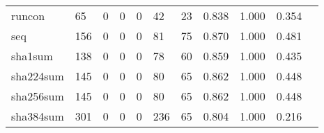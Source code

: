 \begin{longtable}{lp{1.2cm}p{1.2cm}p{1.2cm}p{1.2cm}p{1.2cm}p{1.2cm}p{1.2cm}p{1.2cm}p{1.2cm}p{1.2cm}}
runcon    &                                    65 &                                                  0 &                                                  0 &                                                  0 &                                                 42 &                                                 23 &                                         0.838 &                                              1.000 &                                              0.354 \\
seq       &                                   156 &                                                  0 &                                                  0 &                                                  0 &                                                 81 &                                                 75 &                                         0.870 &                                              1.000 &                                              0.481 \\
sha1sum   &                                   138 &                                                  0 &                                                  0 &                                                  0 &                                                 78 &                                                 60 &                                         0.859 &                                              1.000 &                                              0.435 \\
sha224sum &                                   145 &                                                  0 &                                                  0 &                                                  0 &                                                 80 &                                                 65 &                                         0.862 &                                              1.000 &                                              0.448 \\
sha256sum &                                   145 &                                                  0 &                                                  0 &                                                  0 &                                                 80 &                                                 65 &                                         0.862 &                                              1.000 &                                              0.448 \\
sha384sum &                                   301 &                                                  0 &                                                  0 &                                                  0 &                                                236 &                                                 65 &                                         0.804 &                                              1.000 &                                              0.216 \\

\end{longtable}
